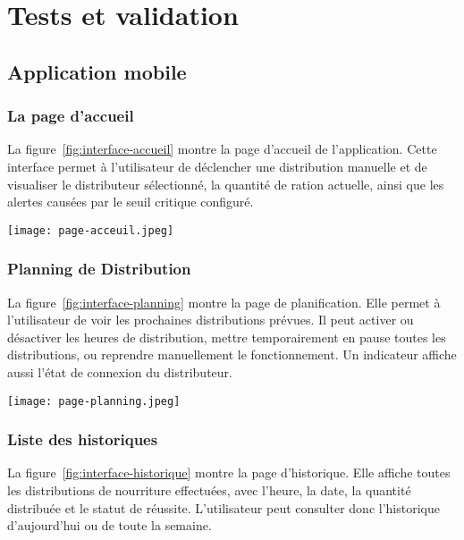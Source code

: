 \pagestyle{fancy}
\fancyhead{} %
\chapter{Tests et validation}
\section{Application mobile}

\subsection{La page d'accueil}
La figure~\ref{fig:interface-accueil} montre la page d'accueil de l'application. Cette interface permet à l’utilisateur de déclencher une distribution manuelle et de visualiser le distributeur sélectionné, la quantité de ration actuelle, ainsi que les alertes causées par le seuil critique configuré.\\

\begin{minipage}{\linewidth}
  \centering
  \texttt{[image: page-acceuil.jpeg]}
  \label{fig:interface-accueil}
\end{minipage}

\subsection{Planning de Distribution}
La figure~\ref{fig:interface-planning} montre la page de planification. Elle permet à l'utilisateur de voir les prochaines distributions prévues. Il peut activer ou désactiver les heures de distribution, mettre temporairement en pause toutes les distributions, ou reprendre manuellement le fonctionnement. Un indicateur affiche aussi l’état de connexion du distributeur.\\

\begin{minipage}{\linewidth}
  \centering
  \texttt{[image: page-planning.jpeg]}
  \label{fig:interface-planning}
\end{minipage}

\subsection{Liste des historiques}
La figure~\ref{fig:interface-historique} montre la page d’historique. Elle affiche toutes les distributions de nourriture effectuées, avec l’heure, la date, la quantité distribuée et le statut de réussite. L’utilisateur peut consulter donc l’historique d’aujourd’hui ou de toute la semaine.\\

